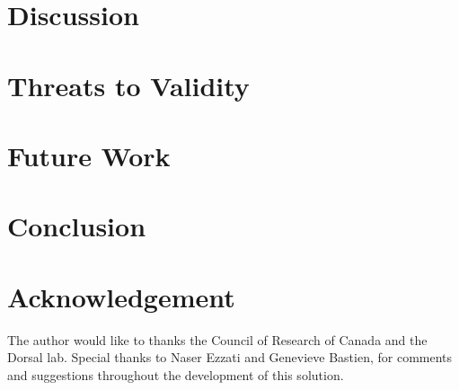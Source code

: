 \section{Discussion}
\label{sec:results}



\section{Threats to Validity}
\label{sec:validity}


\section{Future Work}
\label{sec:fut}


\section{Conclusion}
\label{sec:conclusion}


\section{Acknowledgement}
\label{sec:acknowledgement}
The author would like to thanks the Council of Research of Canada and the Dorsal lab. Special thanks to Naser Ezzati and Genevieve Bastien, for comments and suggestions throughout the development of this solution.


 